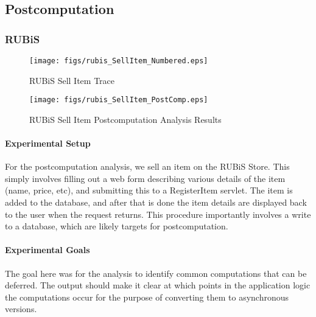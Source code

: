 \documentclass[msc,oneside]{ubcthesis}
\begin{document}
\subsection{Postcomputation}
\label{ana:postcomp}
\subsubsection{RUBiS}

\begin{sidewaysfigure}
\centering
\scalebox{0.44}
{\texttt{[image: figs/rubis\_SellItem\_Numbered.eps]}}
\caption{RUBiS Sell Item Trace} 
\label{fig:sellitemtrace}
\end{sidewaysfigure}

\begin{sidewaysfigure}
\centering
\scalebox{0.44}
{\texttt{[image: figs/rubis\_SellItem\_PostComp.eps]}}
\caption{RUBiS Sell Item Postcomputation Analysis Results} 
\label{fig:sellitempostcomputation}
\end{sidewaysfigure}

\paragraph{Experimental Setup}
For the postcomputation analysis, we sell an item on the RUBiS Store. This simply involves filling out a web form describing various details of the item (name, price, etc), and submitting this to a RegisterItem servlet. The item is added to the database, and after that is done the item details are displayed back to the user when the request returns. This procedure importantly involves a write to a database, which are likely targets for postcomputation.

\paragraph{Experimental Goals}
The goal here was for the analysis to identify common computations that can be deferred. The output should make it clear at which points in the application logic the computations occur for the purpose of converting them to asynchronous versions.
\end{document}
